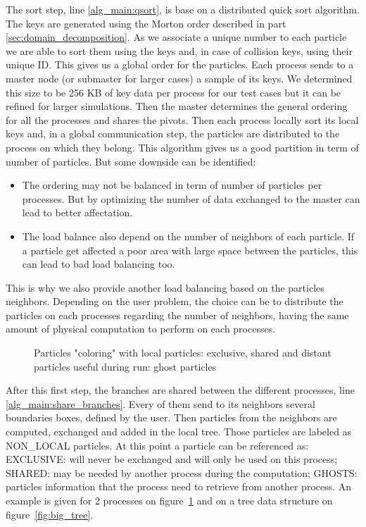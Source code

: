 The sort step, line \ref{alg_main:qsort}, is base on a distributed quick sort algorithm. 
The keys are generated using the Morton order described in part \ref{sec:domain_decomposition}. 
As we associate a unique number to each particle we are able to sort them using the keys and, in case of collision keys, using their unique ID. 
This gives us a global order for the particles. 
Each process sends to a master node (or submaster for larger cases) a sample of its keys. 
We determined this size to be 256 KB of key data per process for our test cases but it can be refined for larger simulations. 
Then the master determines the general ordering for all the processes and shares the pivots. 
Then each process locally sort its local keys and, in a global communication step, the particles are distributed to the process on which they belong. 
This algorithm gives us a good partition in term of number of particles. 
But some downside can be identified:
\begin{itemize}
	\item The ordering may not be balanced in term of number of particles per processes. But by optimizing the number of data exchanged to the master can lead to better affectation. 
	\item The load balance also depend on the number of neighbors of each particle. If a particle get affected a poor area with large space between the particles, this can lead to bad load balancing too. 
\end{itemize}
This is why we also provide another load balancing based on the particles neighbors. 
Depending on the user problem, the choice can be to distribute the particles on each processes regarding the number of neighbors, having the same amount of physical computation to perform on each processes. 

\begin{figure}[t!]
\centering

\caption{Particles "coloring" with local particles: exclusive, shared and distant particles useful during run: ghost particles}
\label{fig:coloring_particles}
\end{figure}

After this first step, the branches are shared between the different processes, line \ref{alg_main:share_branches}. 
Every of them send to its neighbors several boundaries boxes, defined by the user. 
Then particles from the neighbors are computed, exchanged and added in the local tree. 
Those particles are labeled as NON\_LOCAL particles. 
At this point a particle can be referenced as: EXCLUSIVE: will never be exchanged and will only be used on this process; SHARED: may be needed by another process during the computation; GHOSTS: particles information that the process need to retrieve from another process. 
An example is given for 2 processes on figure~\ref{fig:coloring_particles} and on a tree data structure on figure~\ref{fig:big_tree}.

